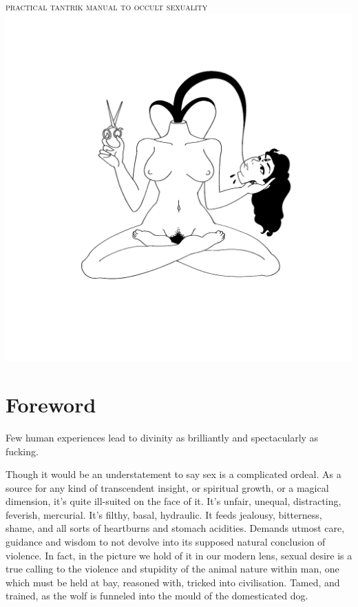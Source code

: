 \documentclass[a4paper,14pt]{memoir}
\begin{document}
\begin{titlingpage}
\centering
{\Huge\bfseries \@title}\\[\baselineskip]
{\scshape practical tantrik manual to occult sexuality}\\[\baselineskip]

\includegraphics[width=6in]{chinna_bw.png}

{\large\scshape \@author}
\end{titlingpage}
\makeatother

\section{Foreword}

Few human experiences lead to divinity as brilliantly and spectacularly as fucking.

Though it would be an understatement to say sex is a complicated ordeal. As a source for any kind of transcendent insight, or spiritual growth, or a magical dimension, it's quite ill-suited on the face of it. It's unfair, unequal, distracting, feverish, mercurial. It's filthy, basal, hydraulic. It feeds jealousy, bitterness, shame, and all sorts of heartburns and stomach acidities. Demands utmost care, guidance and wisdom to not devolve into its supposed natural conclusion of violence. In fact, in the picture we hold of it in our modern lens, sexual desire is a true calling to the violence and stupidity of the animal nature within man, one which must be held at bay, reasoned with, tricked into civilisation. Tamed, and trained, as the wolf is funneled into the mould of the domesticated dog.
\end{document}
